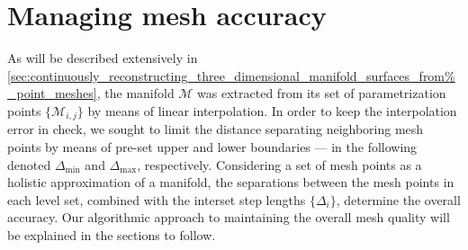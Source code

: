 \section{Managing mesh accuracy}
\label{sec:managing_mesh_accuracy}

As will be described extensively in
\cref{sec:continuously_reconstructing_three_dimensional_manifold_surfaces_from%
_point_meshes},
the manifold $\mathcal{M}$ was extracted from its set of parametrization
points $\{\mathcal{M}_{i,j}\}$ by means of linear interpolation. In order to
keep the interpolation error in check, we sought to limit the distance
separating neighboring mesh points by means of pre-set upper and lower
boundaries --- in the following denoted $\Delta_{\min}$ and $\Delta_{\max}$,
respectively. Considering a set of mesh points as a holistic approximation of a
manifold, the separations between the mesh points in each level set, combined
with the interset step lengths $\{\Delta_{i}\}$, determine the overall
accuracy. Our algorithmic approach to maintaining the overall mesh quality will
be explained in the sections to follow.






